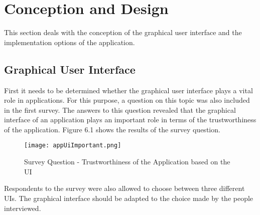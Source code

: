 

\chapter{Conception and Design}
This section deals with the conception of the graphical user interface and the implementation options of the application.
\section{Graphical User Interface}
First it needs to be determined whether the graphical user interface plays a vital role in applications. For this purpose, a question on this topic was also included in the first survey. The answers to this question revealed that the graphical interface of an application plays an important role in terms of the trustworthiness of the application. Figure 6.1 shows the results of the survey question.
\begin{figure}[H]
	\centering
	\texttt{[image: appUiImportant.png]}
	\caption[Survey Question]{Survey Question - Trustworthiness of the Application based on the UI}
\end{figure}
\noindent
Respondents to the survey were also allowed to choose between three different UIs. The graphical interface should be adapted to the choice made by the people interviewed.

